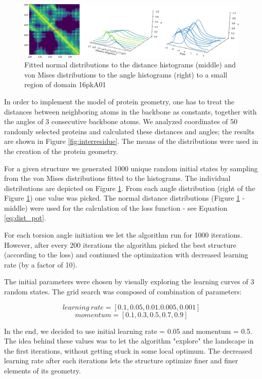 \begin{figure}
    \centering
    \includegraphics[width=\linewidth]{imgs_tomas/norm_histograms.png}
    \caption{Fitted normal distributions to the distance histograms (middle) and von Mises distributions to the angle histograms (right) to a small region of domain 16pkA01}
    \label{fig:distributions}
\end{figure}

In order to implement the model of protein geometry, one has to treat the distances between neighboring atoms in the backbone as constants, together with the angles of 3 consecutive backbone atoms. We analyzed coordinates of 50 randomly selected proteins and calculated these distances and angles; the results are shown in Figure \ref{fig:interresidue}. The means of the distributions were used in the creation of the protein geometry.

For a given structure we generated 1000 unique random initial states by sampling from the von Mises distributions fitted to the histograms. The individual distributions are depicted on Figure \ref{fig:distributions}. From each angle distribution (right of the Figure \ref{fig:distributions}) one value was picked. The normal distance distributions (Figure \ref{fig:distributions} - middle) were used for the calculation of the loss function - see Equation \ref{eq:dist_pot}.

For each torsion angle initiation we let the algorithm run for 1000 iterations. However, after every 200 iterations the algorithm picked the best structure (according to the loss) and continued the optimization with decreased learning rate (by a factor of 10).

The initial parameters were chosen by visually exploring the learning curves of 3 random states. The grid search was composed of combination of parameters:

$$learning~rate = [0.1, 0.05, 0.01. 0.005, 0.001]$$
$$momentum = [0.1, 0.3, 0.5, 0.7, 0.9]$$

In the end, we decided to use initial learning rate = 0.05 and momentum = 0.5. The idea behind these values was to let the algorithm "explore" the landscape in the first iterations, without getting stuck in some local optimum. The decreased learning rate after each iterations lets the structure optimize finer and finer elements of its geometry.

